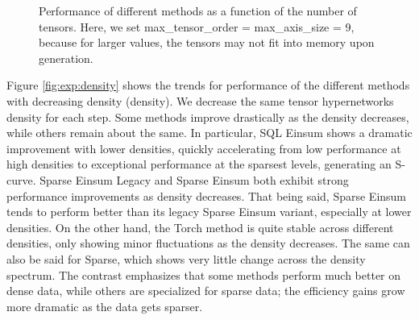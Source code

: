 \begin{figure}[H]
    \caption{Performance of different methods as a function of the number of tensors. Here, we set
        max\_tensor\_order = max\_axis\_size = 9, because for larger values, the tensors may not
        fit into memory upon generation.}
    \label{fig:exp:num_tensors}
\end{figure}

\noindent
Figure \ref{fig:exp:density} shows the trends for performance of the different methods with
decreasing density (density). We decrease the same tensor hypernetworks density for each step. Some
methods improve drastically as the density decreases, while others remain about the same. In particular,
SQL Einsum shows a dramatic improvement with lower densities, quickly accelerating from low
performance at high densities to exceptional performance at the sparsest levels, generating an
S-curve. Sparse Einsum Legacy and Sparse Einsum both exhibit strong performance improvements as
density decreases. That being said, Sparse Einsum tends to perform better than its legacy Sparse
Einsum variant, especially at lower densities. On the other hand, the Torch method is quite stable
across different densities, only showing minor fluctuations as the density decreases. The same can
also be said for Sparse, which shows very little change across the density spectrum. The contrast
emphasizes that some methods perform much better on dense data, while others are specialized
for sparse data; the efficiency gains grow more dramatic as the data gets sparser.

